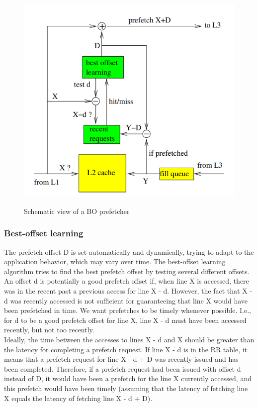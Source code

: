 \documentclass[a4paper]{article}
\begin{document}
        \begin{figure}[h]
        \centering %
        {\includegraphics[width = 0.8 \linewidth]{images/Manish/block_diagram.png}} %
        \caption{Schematic view of a BO prefetcher}
        \label{fig:exm} %
        \end{figure}
        
        \subsubsection*{Best-offset learning}
        The prefetch offset D is set automatically and dynamically, trying to adapt to the application behavior, which may vary over time. The best-offset learning algorithm tries to find the best prefetch offset by testing several different offsets. An offset d is potentially a good prefetch offset if, when line X is accessed, there was in the recent past a previous access for line X - d. However, the fact that X - d was recently accessed is not sufficient for guaranteeing that line X would have been prefetched in time. We want prefetches to be timely whenever possible. I.e., for d to be a good prefetch offset for line X, line X - d must have been accessed recently, but not too recently.\\
        
        Ideally, the time between the accesses to lines X - d and X should be greater than the latency for completing a prefetch request. If line X - d is in the RR table, it means that a prefetch request for line X - d + D was recently issued and has been completed. Therefore, if a prefetch request had been issued with offset d instead of D, it would have been a prefetch for the line X currently accessed, and this prefetch would have been timely (assuming that the latency of fetching line X equals the latency of fetching line X - d + D).\\
        
\end{document}
